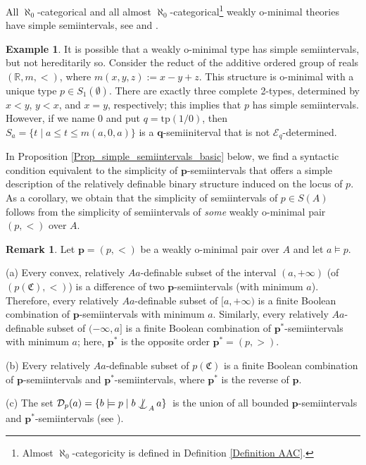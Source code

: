 \documentclass{amsart}
\theoremstyle{definition}
\theoremstyle{definition}
\newtheorem{Example}[Theorem]{Example}
\newtheorem{Remark}[Theorem]{Remark}
\def\notind#1#2{#1\setbox0=\hbox{$#1x$}\kern\wd0
\hbox to 0pt{\mathchardef\nn=12854\hss$#1\nn$\kern1.4\wd0\hss}
\hbox to 0pt{\hss$#1\mid$\hss}\lower.9\ht0 \hbox to 0pt{\hss$#1\smile$\hss}\kern\wd0}
\def\dep{\mathop{\mathpalette\notind{}}}
\newcommand{\Mon}{\mathfrak C}
\newcommand{\tp}{\mathrm{tp}}
\begin{document}
All $\aleph_0$-categorical and all almost $\aleph_0$-categorical\footnote{Almost $\aleph_0$-categoricity is defined in Definition \ref{Definition AAC}.} weakly o-minimal theories have simple semiintervals, see \cite{Baizhanov2006} and \cite{Altayeva2020}.  

\begin{Example}\label{Example_ssi_not hereditary}
It is possible that a weakly o-minimal type has simple semiintervals, but not hereditarily so. Consider the reduct of the additive ordered group of reals $(\mathbb R,m,<)$, where $m(x,y,z):=x-y+z$. This structure is o-minimal with a unique type $p\in S_1(\emptyset)$. There are exactly three complete 2-types, determined by $x<y$, $y<x$, and $x=y$, respectively; this implies that $p$ has simple semiintervals. However, if we name $0$ and put $q=\tp(1/0)$, then $S_a=\{t\mid  a\leqslant t\leqslant m(a,0,a)\}$ is a $\mathbf q$-semiiniterval that is not $\mathcal E_q$-determined. 
\end{Example}


In Proposition \ref{Prop_simple_semiintervals_basic} below, we find a syntactic condition equivalent to the simplicity of $\mathbf p$-semiintervals that offers a simple description of the relatively definable binary structure induced on the locus of $p$. As a corollary, we obtain that the simplicity of semiintervals of $p\in S(A)$ follows from the simplicity of semiintervals of {\em some} weakly o-minimal pair $(p,<)$ over $A$.   
 

\begin{Remark}\label{Remark SEMI rel def set is BC of semiint}
Let $\mathbf p=(p,<)$ be a weakly o-minimal pair over $A$ and let $a\models p$.

(a) Every convex, relatively $Aa$-definable subset of the interval $(a,+\infty)$ (of $(p(\Mon),<)$) is a difference of two $\mathbf p$-semiintervals (with minimum $a$). Therefore, every relatively $Aa$-definable subset of $[a,+\infty)$ is a finite Boolean combination of $\mathbf p$-semiintervals with minimum $a$. Similarly, every relatively $Aa$-definable subset of $(-\infty,a]$ is a finite Boolean combination of $\mathbf p^*$-semiintervals with minimum $a$; here, $\mathbf p^*$ is the opposite order $\mathbf p^*=(p,>)$.

(b)  Every relatively $Aa$-definable subset of $p(\Mon)$ is a finite Boolean combination of $\mathbf p$-semiintervals and $\mathbf p^*$-semiintervals, where $\mathbf p^*$ is the reverse of $\mathbf p$.

(c) The set $\mathcal D_p(a)=\{b\models p\mid b\dep_A a\}$\ is the union of all bounded $\mathbf p$-semiintervals and $\mathbf p^*$-semiintervals (see \cite[Remark 2.4]{MTwqom1}). 
\end{Remark}
\end{document}
